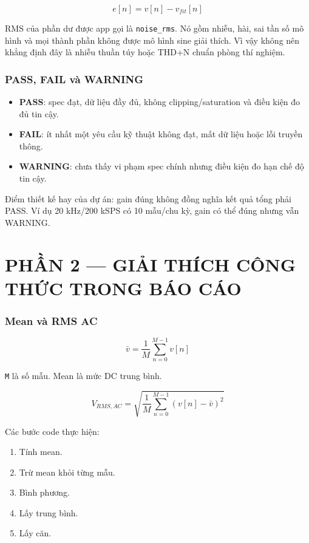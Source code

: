 \documentclass[12pt,a4paper,oneside]{article}
\newcommand{\inlinecode}[1]{\texttt{#1}}
\begin{document}
\[
e[n]=v[n]-v_{fit}[n]
\]

RMS của phần dư được app gọi là \inlinecode{noise\_rms}. Nó gồm nhiễu, hài, sai tần số mô hình và mọi thành phần không được mô hình sine giải thích. Vì vậy không nên khẳng định đây là nhiễu thuần túy hoặc THD+N chuẩn phòng thí nghiệm.

\section{PASS, FAIL và WARNING}

\begin{itemize}
\item \textbf{PASS}: spec đạt, dữ liệu đầy đủ, không clipping/saturation và điều kiện đo đủ tin cậy.
\item \textbf{FAIL}: ít nhất một yêu cầu kỹ thuật không đạt, mất dữ liệu hoặc lỗi truyền thông.
\item \textbf{WARNING}: chưa thấy vi phạm spec chính nhưng điều kiện đo hạn chế độ tin cậy.
\end{itemize}

Điểm thiết kế hay của dự án: gain đúng không đồng nghĩa kết quả tổng phải PASS. Ví dụ 20 kHz/200 kSPS có 10 mẫu/chu kỳ, gain có thể đúng nhưng vẫn WARNING.

\clearpage

\clearpage
\part{PHẦN 2 — GIẢI THÍCH CÔNG THỨC TRONG BÁO CÁO}
\setcounter{section}{0}

\section{Mean và RMS AC}

\[
\bar v=\frac{1}{M}\sum_{n=0}^{M-1}v[n]
\]

\inlinecode{M} là số mẫu. Mean là mức DC trung bình.

\[
V_{RMS,AC}=\sqrt{\frac{1}{M}\sum_{n=0}^{M-1}(v[n]-\bar v)^2}
\]

Các bước code thực hiện:

\begin{enumerate}
\item Tính mean.
\item Trừ mean khỏi từng mẫu.
\item Bình phương.
\item Lấy trung bình.
\item Lấy căn.
\end{enumerate}
\end{document}
